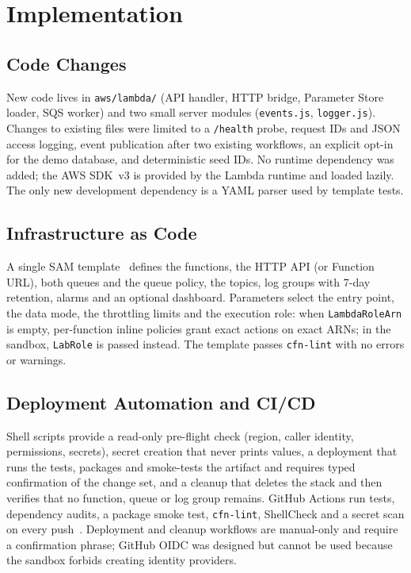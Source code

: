 \documentclass[conference]{IEEEtran}
\newcommand{\code}[1]{\texttt{\small #1}}
\begin{document}
\section{Implementation}
\subsection{Code Changes}
New code lives in \code{aws/lambda/} (API handler, HTTP bridge, Parameter Store loader, SQS
worker) and two small server modules (\code{events.js}, \code{logger.js}). Changes to existing
files were limited to a \code{/health} probe, request IDs and JSON access logging, event
publication after two existing workflows, an explicit opt-in for the demo database, and
deterministic seed IDs. No runtime dependency was added; the AWS SDK~v3 is provided by the
Lambda runtime and loaded lazily. The only new development dependency is a YAML parser used by
template tests.

\subsection{Infrastructure as Code}
A single SAM template~\cite{aws-sam} defines the functions, the HTTP API (or Function URL),
both queues and the queue policy, the topics, log groups with 7-day retention, alarms and an
optional dashboard. Parameters select the entry point, the data mode, the throttling limits and
the execution role: when \code{LambdaRoleArn} is empty, per-function inline policies grant
exact actions on exact ARNs; in the sandbox, \code{LabRole} is passed instead. The template
passes \code{cfn-lint} with no errors or warnings.

\subsection{Deployment Automation and CI/CD}
Shell scripts provide a read-only pre-flight check (region, caller identity, permissions,
secrets), secret creation that never prints values, a deployment that runs the tests,
packages and smoke-tests the artifact and requires typed confirmation of the change set, and a
cleanup that deletes the stack and then verifies that no function, queue or log group remains.
GitHub Actions run tests, dependency audits, a package smoke test, \code{cfn-lint}, ShellCheck
and a secret scan on every push~\cite{gh-actions}. Deployment and cleanup workflows are
manual-only and require a confirmation phrase; GitHub OIDC was designed but cannot be used
because the sandbox forbids creating identity providers.
\end{document}
